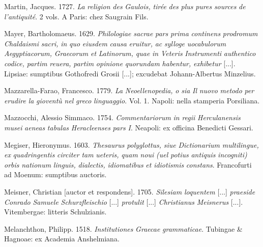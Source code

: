 \documentclass[output=paper]{langsci/langscibook}
\begin{document}
Martin, Jacques. 1727. \textit{La} \textit{religion} \textit{des} \textit{Gaulois,} \textit{tirée} \textit{des} \textit{plus} \textit{pures} \textit{sources} \textit{de} \textit{l’antiquité}. 2 vols. A Paris: chez Saugrain Fils.

Mayer, Bartholomaeus. 1629. \textit{Philologiae} \textit{sacrae} \textit{pars} \textit{prima} \textit{continens} \textit{prodromum} \textit{Chaldaismi} \textit{sacri,} \textit{in} \textit{quo} \textit{eiusdem} \textit{causa} \textit{eruitur,} \textit{ac} \textit{sylloge} \textit{uocabulorum} \textit{Aegyptiacorum,} \textit{Graecorum} \textit{et} \textit{Latinorum,} \textit{quae} \textit{in} \textit{Veteris} \textit{Instrumenti} \textit{authentico} \textit{codice,} \textit{partim} \textit{reuera,} \textit{partim} \textit{opinione} \textit{quorundam} \textit{habentur,} \textit{exhibetur} [...]. Lipsiae: sumptibus Gothofredi Grosii [...]; excudebat Johann-Albertus Minzelius.

Mazzarella-Farao, Francesco. 1779. \textit{La} \textit{Neoellenopedia,} \textit{o} \textit{sia} \textit{Il} \textit{nuovo} \textit{metodo} \textit{per} \textit{erudire} \textit{la} \textit{gioventù} \textit{nel} \textit{greco} \textit{linguaggio}. Vol. 1. Napoli: nella stamperia Porsiliana.

Mazzocchi, Alessio Simmaco. 1754. \textit{Commentariorum} \textit{in} \textit{regii} \textit{Herculanensis} \textit{musei} \textit{aeneas} \textit{tabulas} \textit{Heracleenses} \textit{pars} \textit{I}. Neapoli: ex officina Benedicti Gessari.

Megiser, Hieronymus. 1603. \textit{Thesaurus} \textit{polyglottus,} \textit{siue} \textit{Dictionarium} \textit{multilingue,} \textit{ex} \textit{quadringentis} \textit{circiter} \textit{tam} \textit{ueteris,} \textit{quam} \textit{noui} \textit{(uel} \textit{potius} \textit{antiquis} \textit{incogniti)} \textit{orbis} \textit{nationum} \textit{linguis,} \textit{dialectis,} \textit{idiomatibus} \textit{et} \textit{idiotismis} \textit{constans}. Francofurti ad Moenum: sumptibus auctoris.

Meisner, Christian [auctor et respondens]. 1705. \textit{Silesiam} \textit{loquentem} [...] \textit{praeside} \textit{Conrado} \textit{Samuele} \textit{Schurzfleischio} [...] \textit{protulit} [...] \textit{Christianus} \textit{Meisnerus} [...]. Vitembergae: litteris Schulzianis.

Melanchthon, Philipp. 1518. \textit{Institutiones} \textit{Graecae} \textit{grammaticae}. Tubingae \& Hagnoae: ex Academia Anshelmiana.
\end{document}
